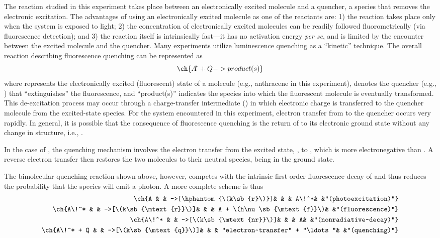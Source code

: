 \documentclass[nobib,nofonts,nols,nohyper]{tufte-handout}
\begin{document}
The reaction studied in this experiment takes place between an electronically excited molecule and a quencher, a species that removes the electronic excitation. 
The advantages of using an electronically excited molecule as one of the reactants are: 
1) the reaction takes place only when the system is exposed to light; 
2) the concentration of electronically excited molecules can be readily followed fluorometrically (via fluorescence detection); and 
3) the reaction itself is intrinsically fast---it has no activation energy \emph{per se}, and is limited by the encounter between the excited molecule and the quencher. 
Many experiments utilize luminescence quenching as a ``kinetic'' technique. 
The overall reaction describing fluorescence quenching can be represented as
\[
	\ch{A\!^* + Q -> product(s)}
\]
where  represents the electronically excited (fluorescent) state of a molecule (e.g., anthracene in this experiment),  denotes the quencher (e.g., ) that ``extinguishes'' the  fluorescence, and ``product(s)'' indicates the species into which the fluorescent molecule is eventually transformed. 
This de-excitation process may occur through a charge-transfer intermediate () in which electronic charge is transferred to the quencher molecule from the excited-state species.
For the system encountered in this experiment, electron transfer from  to the quencher occurs very rapidly. 
In general, it is possible that the consequence of fluorescence quenching is the return of  to its electronic ground state without any change in structure, i.e., .

In the case of , the quenching mechanism involves the electron transfer from the excited state, , to , which is more electronegative than . 
A reverse electron transfer then restores the two molecules to their neutral species,  being in the ground state. 

The bimolecular quenching reaction shown above, however, competes with the intrinsic first-order fluorescence decay of  and thus reduces the probability that the  species will emit a photon. A more complete scheme is thus
\begin{align*}
	\ch{A 			&	&	->[\hphantom{\(k\sb{r}\)}]&	&	&	A\!^*&														&"(photoexcitation)"} \\
	\ch{A\!^* 		&	&	->[\(k\sb{\mtext{r}}\)]&	&	&						A + \(h\nu\sb{\mtext{f}}\)&							&"(fluorescence)"} \\
	\ch{A\!^* 		&	&	->[\(k\sb{\mtext{nr}}\)]&	&	&						A&															&"(nonradiative~decay)"} \\
	\ch{A\!^* + Q	&	&	->[\(k\sb{\mtext{q}}\)]&	&	&						"electron~transfer" + "\ldots"&	&"(quenching)"}
\end{align*}
\end{document}
